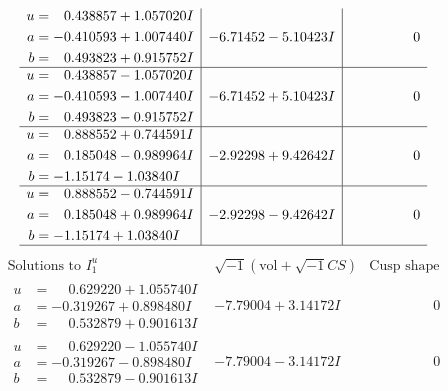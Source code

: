 \documentclass[1p]{elsarticle_modified}
\theoremstyle{definition}
\newcommand{\I}{\sqrt{-1}}
\begin{document}
$$\begin{array}{c|c|c}
\begin{aligned}
u &= \phantom{-}0.438857 + 1.057020 I \\
a &= -0.410593 + 1.007440 I \\
b &= \phantom{-}0.493823 + 0.915752 I\end{aligned}
 & -6.71452 - 5.10423 I & \phantom{-0.000000 } 0 \\ \hline\begin{aligned}
u &= \phantom{-}0.438857 - 1.057020 I \\
a &= -0.410593 - 1.007440 I \\
b &= \phantom{-}0.493823 - 0.915752 I\end{aligned}
 & -6.71452 + 5.10423 I & \phantom{-0.000000 } 0 \\ \hline\begin{aligned}
u &= \phantom{-}0.888552 + 0.744591 I \\
a &= \phantom{-}0.185048 - 0.989964 I \\
b &= -1.15174 - 1.03840 I\end{aligned}
 & -2.92298 + 9.42642 I & \phantom{-0.000000 } 0 \\ \hline\begin{aligned}
u &= \phantom{-}0.888552 - 0.744591 I \\
a &= \phantom{-}0.185048 + 0.989964 I \\
b &= -1.15174 + 1.03840 I\end{aligned}
 & -2.92298 - 9.42642 I & \phantom{-0.000000 } 0\\
 \hline 
 \end{array}$$\newpage$$\begin{array}{c|c|c}  
\text{Solutions to }I^u_{1}& \I (\text{vol} + \sqrt{-1}CS) & \text{Cusp shape}\\
 \hline 
\begin{aligned}
u &= \phantom{-}0.629220 + 1.055740 I \\
a &= -0.319267 + 0.898480 I \\
b &= \phantom{-}0.532879 + 0.901613 I\end{aligned}
 & -7.79004 + 3.14172 I & \phantom{-0.000000 } 0 \\ \hline\begin{aligned}
u &= \phantom{-}0.629220 - 1.055740 I \\
a &= -0.319267 - 0.898480 I \\
b &= \phantom{-}0.532879 - 0.901613 I\end{aligned}
 & -7.79004 - 3.14172 I & \phantom{-0.000000 } 0 \\ \hline\begin{aligned}

\end{aligned}
\end{array}$$
\end{document}
